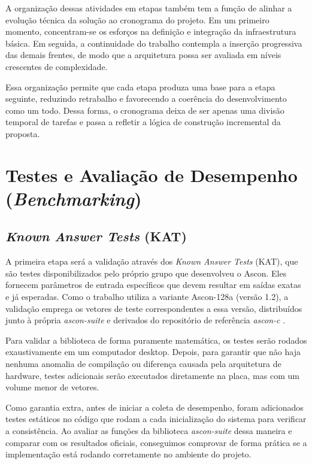 A organização dessas atividades em etapas também tem a função de alinhar a evolução técnica da solução ao cronograma do projeto. Em um primeiro momento, concentram-se os esforços na definição e integração da infraestrutura básica. Em seguida, a continuidade do trabalho contempla a inserção progressiva das demais frentes, de modo que a arquitetura possa ser avaliada em níveis crescentes de complexidade.

Essa organização permite que cada etapa produza uma base para a etapa seguinte, reduzindo retrabalho e favorecendo a coerência do desenvolvimento como um todo. Dessa forma, o cronograma deixa de ser apenas uma divisão temporal de tarefas e passa a refletir a lógica de construção incremental da proposta.


\section{Testes e Avaliação de Desempenho (\textit{Benchmarking})}
\label{subsec:validacao-ascon}
\subsection{\textit{Known Answer Tests} (KAT)}
A primeira etapa será a validação através dos \textit{Known Answer Tests} (KAT), que são testes disponibilizados pelo próprio grupo que desenvolveu o Ascon. Eles fornecem parâmetros de entrada específicos que devem resultar em saídas exatas e já esperadas. Como o trabalho utiliza a variante Ascon-128a (versão 1.2), a validação emprega os vetores de teste correspondentes a essa versão, distribuídos junto à própria \textit{ascon-suite} e derivados do repositório de referência \textit{ascon-c} \cite{ascon_reference_c}.

Para validar a biblioteca de forma puramente matemática, os testes serão rodados exaustivamente em um computador desktop. Depois, para garantir que não haja nenhuma anomalia de compilação ou diferença causada pela arquitetura de hardware, testes adicionais serão executados diretamente na placa, mas com um volume menor de vetores.

Como garantia extra, antes de iniciar a coleta de desempenho, foram adicionados testes estáticos no código que rodam a cada inicialização do sistema para verificar a consistência. Ao avaliar as funções da biblioteca \textit{ascon-suite} dessa maneira e comparar com os resultados oficiais, conseguimos comprovar de forma prática se a implementação está rodando corretamente no ambiente do projeto.

